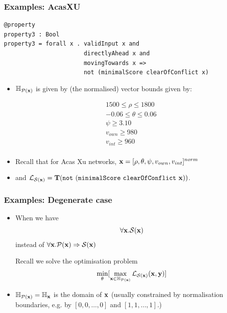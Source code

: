 \documentclass[aspectratio=169]{beamer}
\newcommand{\xs}{\x} 			%
\begin{document}
\begin{frame}[fragile]
\frametitle{Examples: AcasXU}

\begin{block}{}
\begin{verbatim}
@property
property3 : Bool
property3 = forall x . validInput x and 
                       directlyAhead x and 
                       movingTowards x =>
                       not (minimalScore clearOfConflict x)
\end{verbatim}
\end{block}

\begin{itemize}
\item $\mathbb{H}_{\mathcal{P}(\xs)}$ is given by (the normalised) vector bounds given by:

\begin{equation*}
\begin{array}{l}
1500 \leq \rho \leq 1800 \  \\
-0.06 \leq \theta \leq 0.06 \  \\ 
\psi \geq 3.10 \  \\
  v_{own} \geq 980 \ \\
v_{int} \geq 960 \  \\

\end{array}
\end{equation*}

\item Recall that for Acas Xu networks, $\mathbf{x} = [\rho, \theta, \psi, v_{own}, v_{int}]^{norm}$ 

\pause

\item  and $\lossfn_{\mathcal{S}(\xs)} = \translation (\mathtt{not\ (minimalScore\ clearOfConflict}\ \xs))$. 


\end{itemize}
\end{frame}



\begin{frame}[fragile]
\frametitle{Examples: Degenerate case}
\begin{itemize}
\item When we have $$\forall \xs. \mathcal{S}(\xs)$$
instead of 
$\forall \xs. \mathcal{P}(\xs) \Rightarrow \mathcal{S}(\xs)$
\begin{block}{Recall we solve the optimisation problem}
$$\min_{\theta} [ \max_{\xs \in \mathbb{H}_{\mathcal{P}(\xs)}} \lossfn_{\mathcal{S}(\xs)}(\xs, \y)]$$
\end{block}


\item $\mathbb{H}_{\mathcal{P}(\xs)} = \mathbb{H}_{\xs}$ is the domain of $\xs$ (usually constrained by normalisation boundaries, e.g. by $[0, 0 , \ldots , 0]$ and $[1, 1 , \ldots , 1]$.)



\end{itemize}

\end{frame}
\end{document}
